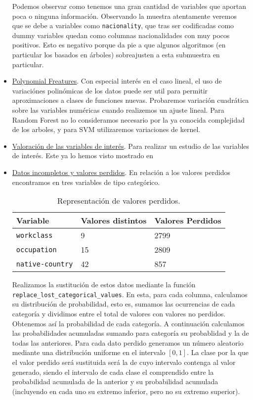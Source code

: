 \documentclass[11pt,a4paper]{article}
\begin{document}
\begin{itemize}
Podemos observar como tenemos una gran cantidad de variables que aportan poca o ninguna información. Observando la muestra atentamente veremos que se debe a variables como \texttt{nacionality}, que tras ser codificadas como dummy variables quedan como columnas nacionalidades con muy pocos positivos. Esto es negativo porque da pie a que algunos algoritmos (en particular los basados en árboles) sobreajusten a esta submuestra en particular. 

\item  \underline{Polynomial Freatures}. Con especial interés en el caso lineal, el uso de variaciónes polinómicas de los datos puede ser util para permitir aproximaciones a clases de funciones nuevas. Probaremos variación cuadrática sobre las variables numéricas cuando realizemos un ajuste lineal. Para Random Forest no lo consideramos necesario por la ya conocida complejidad de los arboles, y para SVM utilizaremos variaciones de kernel. \\
	
	\item \underline{Valoración de las variables de interés}. Para realizar un estudio de las variables de interés. Este ya lo hemos visto mostrado en 
	\item \underline{Datos incompletos y valores perdidos}. En relación a los valores perdidos encontramos en tres variables de tipo categórico.\\
	
\begin{table}[h]
\begin{center}
\begin{tabular}{|l|ll|}
\hline
Variable& Valores distintos & Valores Perdidos\\ \hline
\texttt{workclass} & 9 & 2799\\
\texttt{occupation} & 15 & 2809\\
\texttt{native-country} & 42 & 857\\\hline
\end{tabular}
\end{center}
\caption{Representación de valores perdidos.}
	\end{table}
	
	Realizamos la sustitución de estos datos mediante la función \texttt{replace\_lost\_categorical\_values}. En esta, para cada columna, calculamos su distribución de probabilidad, esto es, sumamos las ocurrencias de cada categoría y dividimos entre el total de valores con valores no perdidos. Obtenemos así la probabilidad de cada categoría. A continuación calculamos las probabilidades acumuladas sumando para categoría su probablidad y la de todas las anteriores. Para cada dato perdido generamos un número aleatorio mediante una distribución uniforme en el intervalo $[0,1]$. La clase por la que el valor perdido será sustituida será la de cuyo intervalo contenga al valor generado, siendo el intervalo de cada clase el comprendido entre la probabilidad acumulada de la anterior y su probabilidad acumulada (incluyendo en cada uno su extremo inferior, pero no su extremo superior).
	

\end{itemize}
\end{document}
